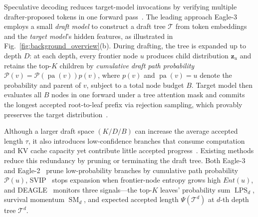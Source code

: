 \documentclass[sigconf,nonacm,10pt]{acmart}
\begin{document}
Speculative decoding reduces target-model invocations by verifying multiple drafter-proposed tokens in one forward pass~\cite{leviathan2023fast,chen2023accelerating}. The leading approach Eagle-3 employs a small \emph{draft model} to construct a draft tree $\mathcal{T}$ from token embeddings and the \emph{target model}'s hidden features, as illustrated in {\color{red}Fig.~\ref{fig:background_overview}(b)}.
During drafting, the tree is expanded up to depth $D$: at each depth, every frontier node $u$ produces child distribution $\mathbf{z}_u$ and retains the top-$K$ children by \emph{cumulative draft path probability} $\mathcal{P}(v)=\mathcal{P}\!\left(\operatorname{pa}(v)\right)p(v)$, where $p(v)$ and $\operatorname{pa}(v)=u$ denote the probability and parent of $v$, subject to a total node budget $B$.
Target model then evaluates all $B$ nodes in one forward under a tree attention mask and commits the longest accepted root-to-leaf prefix via rejection sampling, which provably preserves the target distribution~\cite{leviathan2023fast,chen2023accelerating}.

Although a larger draft space $(K/D/B)$ can increase the average accepted length $\tau$, it also introduces low-confidence branches that consume computation and KV cache capacity yet contribute little accepted progress~\cite{miao2024specinfer}. Existing methods reduce this redundancy by pruning or terminating the draft tree. {\color{blue} Both Eagle-3 and Eagle-2~\cite{li2024eagle2} prune low-probability branches by cumulative path probability $\mathcal{P}(u)$, SVIP~\cite{zhang2025svip} stops expansion when frontier-node entropy grows high $Ent(u)$, and DEAGLE~\cite{deagle2025} monitors three signals---the top-$K$ leaves' probability sum $\operatorname{LPS}_{d}$, survival momentum $\operatorname{SM}_{d}$, and expected accepted length $\Psi(\mathcal T^d)$ at $d$-th depth tree $\mathcal T^d$.}
\end{document}
